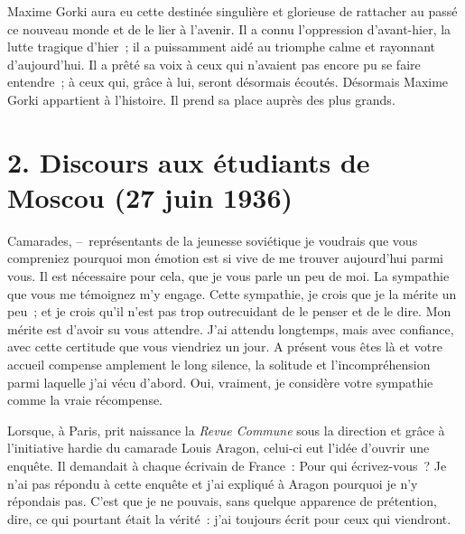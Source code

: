 \documentclass[twoside]{book} %
\begin{document}
Maxime Gorki aura eu cette destinée singulière et glorieuse de rattacher au passé ce nouveau monde et de le lier à l’avenir. Il a connu l’oppression d’avant-hier, la lutte tragique d’hier ; il a puissamment aidé au triomphe calme et rayonnant d’aujourd’hui. Il a prêté sa voix à ceux qui n’avaient pas encore pu se faire entendre ; à ceux qui, grâce à lui, seront désormais écoutés. Désormais Maxime Gorki appartient à l’histoire. Il prend sa place auprès des plus grands.

\section[{2. Discours aux étudiants de Moscou (27 juin 1936)}]{2. Discours aux étudiants de Moscou (27 juin 1936)}

\noindent Camarades, – représentants de la jeunesse soviétique je voudrais que vous compreniez pourquoi mon émotion est si vive de me trouver aujourd’hui parmi vous. Il est nécessaire pour cela, que je vous parle un peu de moi. La sympathie que vous me témoignez m’y engage. Cette sympathie, je crois que je la mérite un peu ; et je crois qu’il n’est pas trop outrecuidant de le penser et de le dire. Mon mérite est d’avoir su vous attendre. J’ai attendu longtemps, mais avec confiance, avec cette certitude que vous viendriez un jour. A présent vous êtes là et votre accueil compense amplement le long silence, la solitude et l’incompréhension parmi laquelle j’ai vécu d’abord. Oui, vraiment, je considère votre sympathie comme la vraie récompense.\par
Lorsque, à Paris, prit naissance la \emph{Revue Commune} sous la direction et grâce à l’initiative hardie du camarade Louis Aragon, celui-ci eut l’idée d’ouvrir une enquête. Il demandait à chaque écrivain de France : Pour qui écrivez-vous ? Je n’ai pas répondu à cette enquête et j’ai expliqué à Aragon pourquoi je n’y répondais pas. C’est que je ne pouvais, sans quelque apparence de prétention, dire, ce qui pourtant était la vérité : j’ai toujours écrit pour ceux qui viendront.\par
\end{document}
